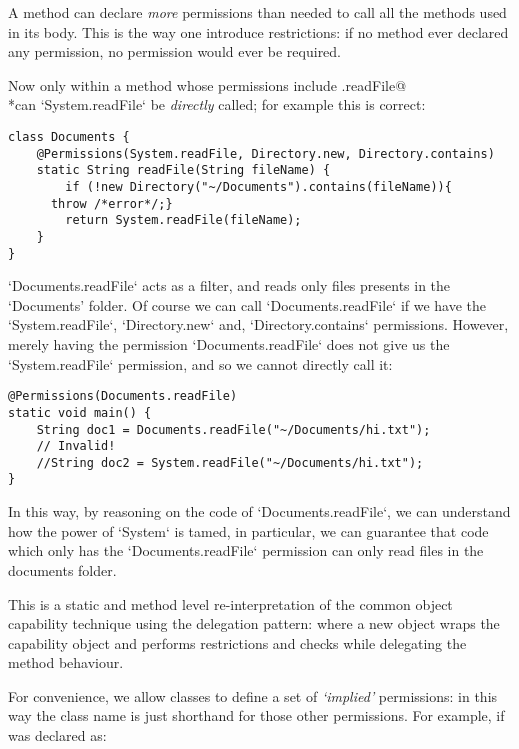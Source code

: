 \documentclass[a4paper,twoside,british,9pt]{extarticle}
\providecommand*{\code}[1]{\Q`#1`}
\begin{document}
A method can declare \textit{more} permissions than needed to call all the methods
used in its body.
This is the way one introduce restrictions: if no method ever declared any permission, no permission
would ever be required.

Now only within a method whose permissions include \Q@System.readFile@
\\*can \code{System.readFile} be \emph{directly} called; for example this
is correct:

\begin{lstlisting}
class Documents {
	@Permissions(System.readFile, Directory.new, Directory.contains)
	static String readFile(String fileName) {
		if (!new Directory("~/Documents").contains(fileName)){
      throw /*error*/;}
		return System.readFile(fileName);
	}
}
\end{lstlisting}

\code{Documents.readFile} acts as a filter, and reads only files
presents in the `Documents' folder. Of course we can call \code{Documents.readFile}
if we have the \code{System.readFile}, \code{Directory.new} and,
\code{Directory.contains} permissions. However, merely having the
permission \code{Documents.readFile} does not give us the  \code{System.readFile}
permission, and so we cannot directly call it:

\begin{lstlisting}
@Permissions(Documents.readFile)
static void main() {
	String doc1 = Documents.readFile("~/Documents/hi.txt");
	// Invalid!
	//String doc2 = System.readFile("~/Documents/hi.txt");
}
\end{lstlisting}

In this way, by reasoning on the code of \code{Documents.readFile},
we can understand how the power of \code{System} is tamed, in particular,
we can guarantee that code which  only has the \code{Documents.readFile}
permission can only read files in the documents folder.

This is a static and method level re-interpretation of the common object capability technique
using the delegation pattern: where a new object wraps
the capability object and performs restrictions and checks while delegating the method behaviour.


For convenience, we allow classes to define a set of \emph{`implied'}
permissions: in this way the class name is just shorthand for those
other permissions. For example, if \Q@Directory@ was declared as:
\end{document}
